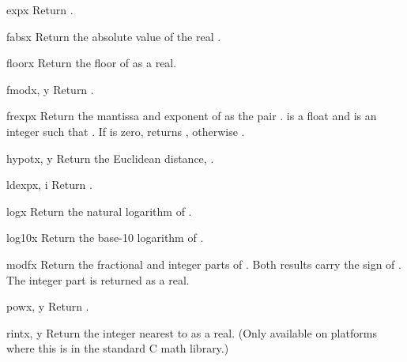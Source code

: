 \begin{funcdesc}{exp}{x}
Return .
\end{funcdesc}

\begin{funcdesc}{fabs}{x}
Return the absolute value of the real .
\end{funcdesc}

\begin{funcdesc}{floor}{x}
Return the floor of  as a real.
\end{funcdesc}

\begin{funcdesc}{fmod}{x, y}
Return .
\end{funcdesc}

\begin{funcdesc}{frexp}{x}
Return the mantissa and exponent of  as the pair
.   is a float and  is an
integer such that .
If  is zero, returns , otherwise
.
\end{funcdesc}

\begin{funcdesc}{hypot}{x, y}
Return the Euclidean distance, .
\end{funcdesc}

\begin{funcdesc}{ldexp}{x, i}
Return .
\end{funcdesc}

\begin{funcdesc}{log}{x}
Return the natural logarithm of .
\end{funcdesc}

\begin{funcdesc}{log10}{x}
Return the base-10 logarithm of .
\end{funcdesc}

\begin{funcdesc}{modf}{x}
Return the fractional and integer parts of .  Both results
carry the sign of .  The integer part is returned as a real.
\end{funcdesc}

\begin{funcdesc}{pow}{x, y}
Return .
\end{funcdesc}

\begin{funcdesc}{rint}{x, y}
Return the integer nearest to  as a real.
(Only available on platforms where this is in the standard C math library.)
\end{funcdesc}


